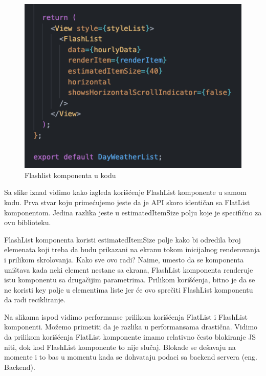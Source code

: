 \documentclass[12pt,oneside]{memoir}
\begin{document}
\begin{figure}[h!]
    \centering
    \includegraphics[scale=0.5]{docs/images/chapterFive/flashlistExample.png}
    \caption{Flashlist komponenta u kodu}
    \label{fig:flatListExample}
\end{figure}

Sa slike iznad vidimo kako izgleda korišćenje FlashList komponente u samom kodu. Prva stvar koju primećujemo jeste da je API skoro identičan sa FlatList komponentom. Jedina razlika jeste u estimatedItemSize polju koje je specifično za ovu biblioteku.


FlashList komponenta koristi estimatedItemSize polje kako bi odredila broj elemenata koji treba da budu prikazani na ekranu tokom inicijalnog renderovanja i prilikom skrolovanja. Kako sve ovo radi? Naime, umesto da se komponenta uništava kada neki element nestane sa ekrana, FlashList komponenta renderuje istu komponentu sa drugačijim parametrima. Prilikom korišćenja, bitno je da se ne koristi key polje u elementima liste jer će ovo sprečiti FlashList komponentu da radi recikliranje.


Na slikama ispod vidimo performanse prilikom korišćenja FlatList i FlashList komponenti. Možemo primetiti da je razlika u performansama drastična. Vidimo da prilikom korišćenja FlatList komponente imamo relativno često blokiranje JS niti, dok kod FlashList komponente to nije slučaj. Blokade se dešavaju na momente i to bas u momentu kada se dohvataju podaci sa backend servera (eng. Backend).
\end{document}
